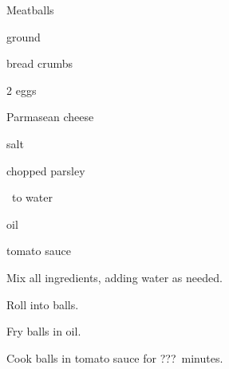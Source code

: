 \begin{recipe}{Meatballs}{}{}

\begin{ingredients}
\item {} ground 
\item \lbs{\half} bread crumbs
\item 2 eggs
\item {} Parmasean cheese
\item salt
\item chopped parsley
\item \quarter\ to \C{\half} water
\item oil
\item tomato sauce
\end{ingredients}

\begin{directions}
\item Mix all ingredients, adding water as needed.
\item Roll into balls.
\item Fry balls in oil.
\item Cook balls in tomato sauce for ???~minutes.
\end{directions}
\end{recipe}
